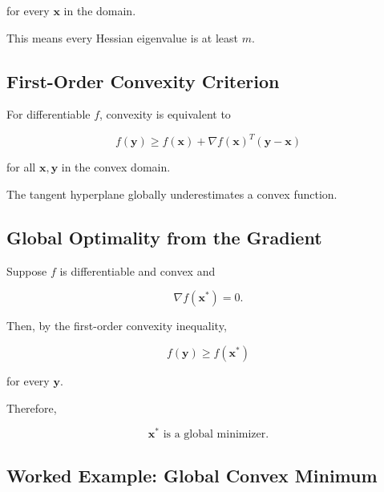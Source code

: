for every \(\mathbf{x}\) in the domain.

This means every Hessian eigenvalue is at least \(m\).

\subsection{First-Order Convexity Criterion}
\label{subsec:first-order-convexity-criterion}

For differentiable \(f\), convexity is equivalent to

\[
\boxed{
f(\mathbf{y})
\geq
f(\mathbf{x})
+
\nabla f(\mathbf{x})^T
(
\mathbf{y}-\mathbf{x}
)
}
\]

for all \(\mathbf{x},\mathbf{y}\) in the convex domain.

The tangent hyperplane globally underestimates a convex function.

\subsection{Global Optimality from the Gradient}
\label{subsec:convex-gradient-global-optimality}

Suppose \(f\) is differentiable and convex and

\[
\boxed{
\nabla f(\mathbf{x}^*)=0.
}
\]

Then, by the first-order convexity inequality,

\[
f(\mathbf{y})
\geq
f(\mathbf{x}^*)
\]

for every \(\mathbf{y}\).

Therefore,

\[
\boxed{
\mathbf{x}^*
\text{ is a global minimizer}.
}
\]

\subsection{Worked Example: Global Convex Minimum}
\label{subsec:worked-global-convex-minimum}

